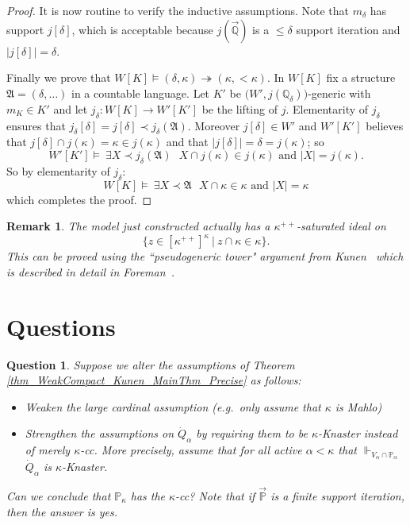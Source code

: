 \documentclass{amsart}
\newtheorem{question}[theorem]{Question}
\newtheorem{remark}[theorem]{Remark}
\begin{document}
\begin{proof}
It is now routine to verify the inductive assumptions.  Note that $m_\delta$ has support $j[\delta]$, which is acceptable because $j(\vec{\mathbb{Q}})$ is a $\le \delta$ support iteration and $|j[\delta]|=\delta$.

Finally we prove that $W[K] \models (\delta, \kappa) \twoheadrightarrow (\kappa, < \kappa)$.  In $W[K]$ fix a structure $\mathfrak{A} = (\delta, \dots)$ in a countable language.  Let $K'$ be $\big(W', j(\mathbb{Q}_\delta) \big)$-generic with $m_K \in K'$ and let $j_\delta: W[K] \to W'[K']$ be the lifting of $j$.  Elementarity of $j_\delta$ ensures that $j_\delta[\delta] = j[\delta] \prec j_\delta(\mathfrak{A})$.  Moreover $j[\delta] \in W'$ and $W'[K']$ believes that $j[\delta] \cap j(\kappa) = \kappa \in j(\kappa)$ and that $|j[\delta]| = \delta = j(\kappa)$; so
\[
W'[K'] \models \ \exists X \prec j_\delta(\mathfrak{A}) \ \ \ X \cap j(\kappa) \in j(\kappa) \text{ and } |X|  = j(\kappa).
\]
So by elementarity of $j_\delta$:
\[
W[K] \models \ \exists X \prec \mathfrak{A} \ \ \ X \cap \kappa \in \kappa \text{ and } |X|  = \kappa
\]
which completes the proof.
\end{proof}








\begin{remark}
The model just constructed actually has a $\kappa^{++}$-saturated ideal on 
\[
\{ z \in [\kappa^{++}]^\kappa \ | \ z \cap \kappa \in \kappa   \}.
\]
This can be proved using the ``pseudogeneric tower" argument from Kunen~\cite{MR495118} which is described in detail in Foreman~\cite{MattHandbook}.
\end{remark}

\section{Questions}



\begin{question}
Suppose we alter the assumptions of Theorem \ref{thm_WeakCompact_Kunen_MainThm_Precise} as follows:
\begin{itemize}
 \item Weaken the large cardinal assumption (e.g.\ only assume that $\kappa$ is Mahlo)
 \item Strengthen the assumptions on $\dot{Q}_\alpha$ by requiring them to be $\kappa$-Knaster instead of merely $\kappa$-cc.  More precisely, assume that for all active $\alpha < \kappa$ that $\Vdash_{V_\alpha \cap \mathbb{P}_\alpha}$ $\dot{Q}_\alpha$ is $\kappa$-Knaster.  
\end{itemize}
Can we conclude that $\mathbb{P}_\kappa$ has the $\kappa$-cc?  Note that if $\vec{\mathbb{P}}$ is a finite support iteration, then the answer is yes.  
\end{question}
\end{document}
